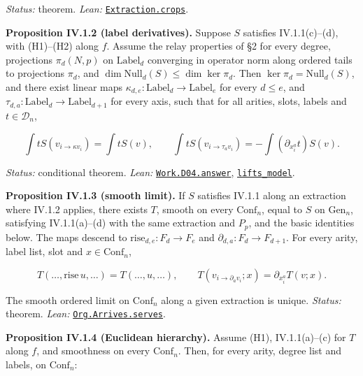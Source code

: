 \documentclass[
  letterpaper,
  11pt]{article}
\begin{document}
\emph{Status:} theorem. \emph{Lean:}
\href{https://github.com/yang-mills-group/OpenAI-YM-20261028/blob/3456e5e75cf8d4cd558955a5c7638fba2d68f464/YM/Extraction/Held.lean\#L136-L137}{\texttt{Extraction.crops}}.

\textbf{Proposition IV.1.2 (label derivatives).} Suppose \(S\) satisfies
IV.1.1(c)--(d), with (H1)--(H2) along \(f\). Assume the relay properties
of §2 for every degree, projections \(\pi_d(N,p)\) on
\(\mathrm{Label}_d\) converging in operator norm along ordered tails to
projections \(\pi_d\), and \(\dim\mathrm{Null}_d(S)\le\dim\ker\pi_d\).
Then \(\ker\pi_d=\mathrm{Null}_d(S)\), and there exist linear maps
\(\kappa_{d,e}:\mathrm{Label}_d\to\mathrm{Label}_e\) for every
\(d\le e\), and \(\tau_{d,a}:\mathrm{Label}_d\to\mathrm{Label}_{d+1}\)
for every axis, such that for all arities, slots, labels and
\(t\in\mathcal D_n\),

\[\int tS(v_{i\to\kappa v_i})=\int tS(v),\qquad \int tS(v_{i\to\tau_av_i})=-\int(\partial_{x_i^a}t)S(v).\]

\emph{Status:} conditional theorem. \emph{Lean:}
\href{https://github.com/yang-mills-group/OpenAI-YM-20261028/blob/3456e5e75cf8d4cd558955a5c7638fba2d68f464/YM/Work/D04.lean\#L212-L240}{\texttt{Work.D04.answer}},
\href{https://github.com/yang-mills-group/OpenAI-YM-20261028/blob/3456e5e75cf8d4cd558955a5c7638fba2d68f464/YM/Dash/Inert.lean\#L71-L87}{\texttt{lifts\_model}}.

\textbf{Proposition IV.1.3 (smooth limit).} If \(S\) satisfies IV.1.1
along an extraction where IV.1.2 applies, there exists \(T\), smooth on
every \(\mathrm{Conf}_n\), equal to \(S\) on \(\mathrm{Gen}_n\),
satisfying IV.1.1(a)--(d) with the same extraction and \(P_p\), and the
basic identities below. The maps descend to
\(\mathrm{rise}_{d,e}:F_d\to F_e\) and
\(\partial_{d,a}:F_d\to F_{d+1}\). For every arity, label list, slot and
\(x\in\mathrm{Conf}_n\),

\[T(\dots,\mathrm{rise}\,u,\dots)=T(\dots,u,\dots),\qquad T(v_{i\to\partial_av_i};x)=\partial_{x_i^a}T(v;x).\]

The smooth ordered limit on \(\mathrm{Conf}_n\) along a given extraction
is unique. \emph{Status:} theorem. \emph{Lean:}
\href{https://github.com/yang-mills-group/OpenAI-YM-20261028/blob/3456e5e75cf8d4cd558955a5c7638fba2d68f464/YM/Org/Input.lean\#L101-L109}{\texttt{Org.Arrives.serves}}.

\textbf{Proposition IV.1.4 (Euclidean hierarchy).} Assume (H1),
IV.1.1(a)--(c) for \(T\) along \(f\), and smoothness on every
\(\mathrm{Conf}_n\). Then, for every arity, degree list and labels, on
\(\mathrm{Conf}_n\):
\end{document}

